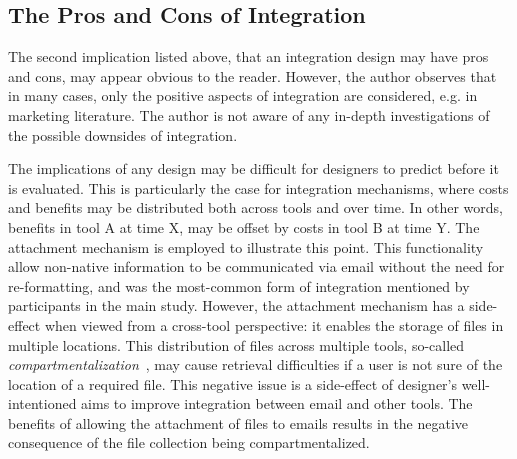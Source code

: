 \subsection{The Pros and Cons of Integration}

The second implication listed above, that an integration design may have pros and cons, may appear obvious to the reader.  However, the author observes that in many cases, only the positive aspects of integration are considered, e.g. in marketing literature.  The author is not aware of any in-depth investigations of the possible downsides of integration.  

The implications of any design may be difficult for designers to predict before it is evaluated.  This is particularly the case for integration mechanisms, where costs and benefits may be distributed both across tools and over time.  In other words, benefits in tool A at time X, may be offset by costs in tool B at time Y.  The attachment mechanism is employed to illustrate this point.  This functionality allow non-native information to be communicated via email without the need for re-formatting, and was the most-common form of integration mentioned by participants in the main study.  %
However, the attachment mechanism has a side-effect when viewed from a cross-tool perspective: it enables the storage of files in multiple locations. This distribution of files across multiple tools, so-called \textit{compartmentalization}~\citep{Bellotti:00}, may cause retrieval difficulties if a user is not sure of the location of a required file.  This negative issue is a side-effect of designer's well-intentioned aims to improve integration between email and other tools.  The benefits of allowing the attachment of files to emails results in the negative consequence of the file collection being compartmentalized.


